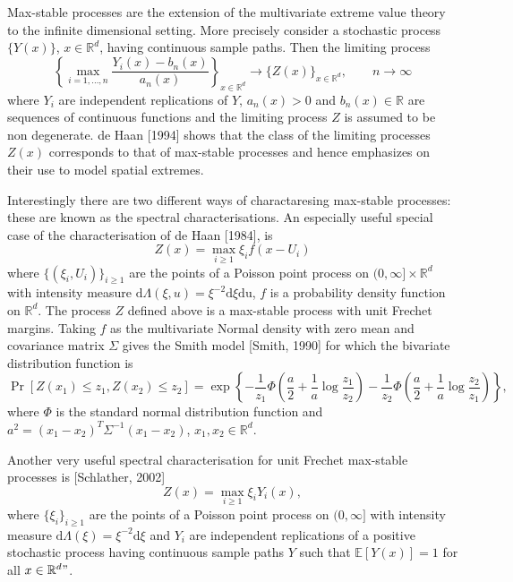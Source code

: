 \documentclass{article}
\begin{document}
Max-stable processes are the extension of the multivariate extreme
value theory to the infinite dimensional setting. More precisely
consider a stochastic process $\{Y(x)\}$, $x \in \mathbb{R}^d$, having
continuous sample paths. Then the limiting process
\begin{equation}
\label{eq:limitProcess}
\left\{ \max_{i=1, \ldots, n}
       \frac{Y_i(x) -b_n(x)}{a_n(x)} \right\}_{x \in \mathbb{R}^d}
\longrightarrow \{Z(x)\}_{x \in \mathbb{R}^d}, \qquad n \to \infty
\end{equation}
where $Y_i$ are independent replications of $Y$, $a_n(x)> 0$ and
$b_n(x) \in \mathbb{R}$ are sequences of continuous functions and the
limiting process $Z$ is assumed to be non degenerate. de Haan [1994]
shows that the class of the limiting processes $Z(x)$ corresponds to
that of max-stable processes and hence emphasizes on their use to
model spatial extremes.

Interestingly there are two different ways of charactaresing
max-stable processes: these are known as the spectral
characterisations. An especially useful special case of the
characterisation of de Haan [1984], is
\begin{equation}
\label{eq:deHaanCarac}
Z(x) = \max_{i\geq 1} \xi_i f(x - U_i)
\end{equation}
where $\{(\xi_i, U_i)\}_{i \geq 1}$ are the points of a Poisson point
process on $(0, \infty] \times \mathbb{R}^d$ with intensity measure
$\mbox{d$\Lambda$}(\xi,u) = \xi^{-2} \mbox{d$\xi$} \mbox{du}$, $f$ is
a probability density function on $\mathbb{R}^d$. The process $Z$
  defined above is a max-stable process with unit Frechet
margins. Taking $f$ as the multivariate Normal density with zero mean
and covariance matrix $\Sigma$ gives the Smith model [Smith, 1990] for
which the bivariate distribution function is
\begin{equation}
\label{eq:smithCDF}
\Pr[Z(x_1) \leq z_1, Z(x_2)
    \leq z_2] = \exp\left\{- \frac{1}{z_1} \Phi\left(\frac{a}{2} +
                                                       \frac{1}{a} \log \frac{z_1}{z_2} \right) - \frac{1}{z_2}
                           \Phi\left(\frac{a}{2} + \frac{1}{a} \log \frac{z_2}{z_1} \right)
                           \right\},
\end{equation}
where $\Phi$ is the standard normal distribution function and $a^2 =
  (x_1 - x_2)^T \Sigma^{-1} (x_1 - x_2)$, $x_1, x_2 \in \mathbb{R}^d$.

Another very useful spectral characterisation for unit Frechet
max-stable processes is [Schlather, 2002]
\begin{equation}
\label{eq:schlatherCarac}
Z(x) = \max_{i \geq 1} \xi_i Y_i(x),
\end{equation}
where $\{\xi_i\}_{i \geq 1}$ are the points of a Poisson point process
on $(0, \infty]$ with intensity measure $\mbox{d$\Lambda$}(\xi) =
  \xi^{-2} \mbox{d$\xi$}$ and $Y_i$ are independent replications of a
positive stochastic process having continuous sample paths $Y$ such
that $\mathbb{E}[Y(x)] = 1$ for all $x \in \mathbb{R}^d"$.
\end{document}
